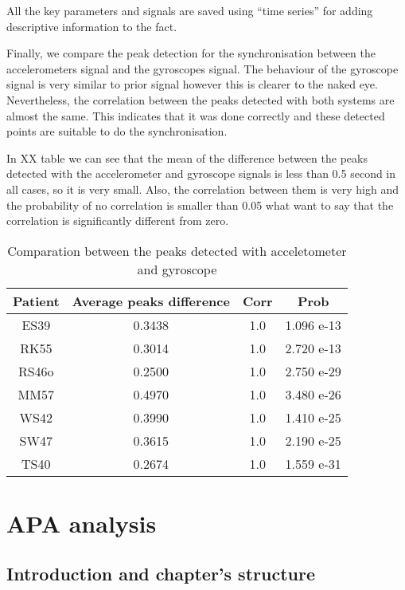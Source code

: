 All the key parameters and signals are saved using “time series”  for adding descriptive information to the fact.

Finally, we compare the peak detection for the synchronisation between the accelerometers signal and the gyroscopes signal. The behaviour of the gyroscope signal is very similar to prior signal however this is clearer to the naked eye.
Nevertheless, the correlation between the peaks detected with both systems are almost the same. This indicates that it was done correctly and these detected points are suitable to do the synchronisation.

In XX table we can see that the mean of the difference between the peaks detected with the accelerometer and gyroscope signals is less than 0.5 second in all cases, so it is very small. Also, the correlation between them is very high and the probability of no correlation is smaller than 0.05 what want to say that the correlation is significantly different from zero.

\begin{table}[h]
	\caption{Comparation between the peaks detected with acceletometer and gyroscope}	
	\centering
	\begin{tabular}{|c|c|c|c|}\hline
		
		Patient 				& Average peaks difference 	& Corr 	& Prob 	\\ \hline
		ES39 & 0.3438			& 1.0									& 1.096 e-13					\\
		RK55	& 0.3014			& 1.0									& 2.720 e-13				\\
		RS46o & 0.2500			& 1.0									& 2.750  e-29					\\
		MM57	& 0.4970			& 1.0									& 3.480 e-26					\\
		WS42  & 0.3990			& 1.0									& 1.410 e-25					\\
		SW47	& 0.3615			& 1.0									& 2.190 e-25					\\
		TS40  & 0.2674			& 1.0									& 1.559 e-31				\\ \hline
	\end{tabular}
	\label{tab:comparationAccGyro}
	
\end{table}



\section{APA analysis}
\subsection{Introduction and chapter's structure}

